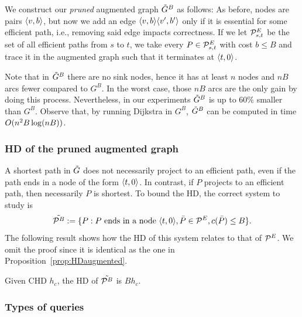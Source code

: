 \documentclass[opre,nonblindrev]{informs3} %
\begin{document}
We construct our \emph{pruned} augmented graph $\tilde G^B$ as follows:
As before, nodes are pairs $\langle v,b\rangle$, but now we add an edge $\langle v,b\rangle\langle v',b'\rangle$ only if it is essential for some efficient path, i.e., removing said edge impacts correctness.
If we let $\mathcal{P}_{s,t}^E$ be the set of all efficient paths from $s$ to $t$, we take every $P\in \mathcal{P}_{s,t}^E$ with cost $b\leq B$ and trace it in the augmented graph such that it terminates at $\langle t,0\rangle$.

Note that in $\tilde G^B$ there are no sink nodes, hence it has at least $n$ nodes and $nB$ arcs fewer compared to $G^B$.
In the worst case, those $nB$ arcs are the only gain by doing this process.
Nevertheless, in our experiments $\tilde G^B$ is up to 60\% smaller than $G^B$.
Observe that, by running Dijkstra in $G^B$, $\tilde G^B$ can be computed in time $O(n^2B\log(nB))$.

\subsubsection{HD of the pruned augmented graph}

A shortest path in $\tilde G$ does not necessarily project to an efficient path, even if the path ends in a node of the form $\langle t,0\rangle$.
In contrast, if $P$ projects to an efficient path, then necessarily $P$ is shortest. 
To bound the HD, the correct system to study is
\[
\tilde{\mathcal{P}^B}:=\{P: P\text{ ends in a node }\langle t,0\rangle, \bar P\in \mathcal{P}^E, c(\bar P)\leq B \}.
\]
The following result shows how the HD of this system relates to that of $\mathcal{P}^E$.
We omit the proof since it is identical as the one in Proposition~\ref{prop:HDaugmented}.
\begin{proposition}
Given CHD $h_c$, the HD of $\tilde{\mathcal{P}^B}$ is $Bh_c$.
\end{proposition}

\subsubsection{Types of queries}
\end{document}
